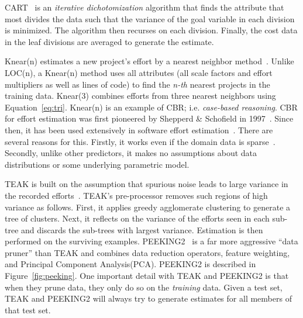 \documentclass[smallcondesed]{svjour3}
\newcommand{\fig}[1]{Figure~\ref{fig:#1}}
\newenvironment{BLUE}{\color{blue}}{\ignorespacesafterend}
\newcommand{\HERE}[1]{\label{err:#1}
 \reversemarginpar\marginnote{\textcolor{blue}{(#1)}}}
\begin{document}
CART~\cite{breiman84} is an {\em iterative dichotomization} algorithm
that finds the attribute that most divides the data such that
the variance of the goal variable in each division is minimized.
The algorithm then recurses on each division. 
Finally, the cost data in the leaf divisions
are averaged to generate the estimate. 


Knear(n) estimates a new project's effort
by a nearest neighbor  method~\cite{shepperd97}. Unlike LOC(n),
a Knear(n) method uses all attributes
(all scale factors and effort multipliers as well as lines of code)
to find the {\em n-th} nearest projects in the training data. 
Knear(3) combines efforts from three nearest neighbors using
Equation~\ref{eq:tri}.
Knear(n) is an example of CBR; i.e.  {\em case-based reasoning}.
CBR for effort estimation was 
first pioneered by Shepperd \& Schofield
in 1997~\cite{shepperd97}.
  Since then, it 
has been used extensively in software effort
estimation~\cite{Auer2006,Walkerden1999,%
  Kirsopp2002,shepperd97,kadoda00,Li2008,Li2006,Li2007,Li2009a,
  keung2008a,keung2008b,keung2008c}.  
There are several reasons  for this. Firstly, 
it works even if the domain data is sparse~\cite{Myrtveit}.
Secondly, 
unlike other predictors, it makes no assumptions about data
distributions or some  underlying parametric model. 

TEAK is built
on the assumption that spurious noise leads to large variance in the recorded efforts~\cite{koc11b}.
TEAK's pre-processor removes such regions of high variance as follows.
First, it  applies greedy agglomerate clustering  to generate a tree of clusters.
Next, it reflects on the variance
of the efforts seen in each sub-tree and discards the sub-trees with largest variance. Estimation is then performed
on the surviving examples.
PEEKING2~\cite{papa13} is a far more aggressive ``data pruner'' than TEAK and combines   data reduction operators, 
feature weighting, and Principal Component Analysis(PCA). PEEKING2 is described in  \fig{peeking}.
\begin{BLUE}\HERE{Reviewer2d}
  One important detail with TEAK and PEEKING2 is that when they prune data, they
  only do so on the {\em training} data. Given a test set, TEAK and PEEKING2 will always try to
  generate estimates for all members of that test set.
  \end{BLUE}
  
\end{document}

